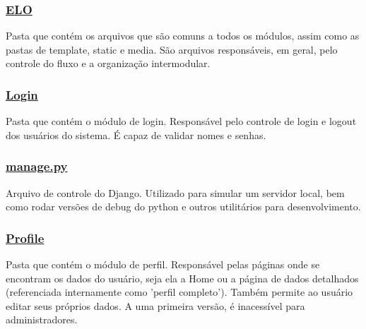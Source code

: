 \subsubsection*{\hyperlink{namespaceELO}{E\-L\-O}}

Pasta que contém os arquivos que são comuns a todos os módulos, assim como as pastas de template, static e media. São arquivos responsáveis, em geral, pelo controle do fluxo e a organização intermodular.

\subsubsection*{\hyperlink{namespaceLogin}{Login}}

Pasta que contém o módulo de login. Responsável pelo controle de login e logout dos usuários do sistema. É capaz de validar nomes e senhas.

\subsubsection*{\hyperlink{manage_8py}{manage.\-py}}

Arquivo de controle do Django. Utilizado para simular um servidor local, bem como rodar versões de debug do python e outros utilitários para desenvolvimento.

\subsubsection*{\hyperlink{namespaceProfile}{Profile}}

Pasta que contém o módulo de perfil. Responsável pelas páginas onde se encontram os dados do usuário, seja ela a Home ou a página de dados detalhados (referenciada internamente como 'perfil completo'). Também permite ao usuário editar seus próprios dados. A uma primeira versão, é inacessível para administradores. 